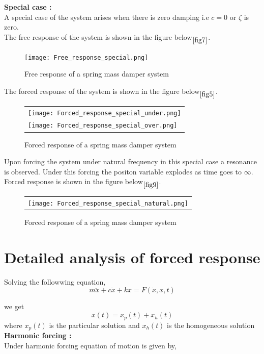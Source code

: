 \documentclass[11pt]{article}
\begin{document}
\newpage
\noindent\textbf{Special case :} \\
A special case of the system arises when there is zero damping i.e $c = 0$ or $\zeta$ is zero. \\
The free response of the system is shown in the figure below$\phantom{}_{\ref{fig7}}$.

\begin{figure}[H]
	\centering
	\centering
	\texttt{[image: Free\_response\_special.png]}
	\caption{Free response of a spring mass damper system}
\end{figure}
\label{fig7}

\newpage
The forced response of the system is shown in the figure below$\phantom{}_{\ref{fig5}}$.

\begin{figure}[H]
	\centering
	\begin{tabular} {l}
	\texttt{[image: Forced\_response\_special\_under.png]} \\
	\texttt{[image: Forced\_response\_special\_over.png]} 
	\end{tabular}
	\caption{Forced response of a spring mass damper system}
\end{figure}
\label{fig8}

\newpage
\noindent Upon forcing the system under natural frequency in this special case a resonance is observed. Under this
forcing the positon variable explodes as time goes to $\infty$.\\
Forced response is shown in the figure below$\phantom{}_{\ref{fig9}}$.


\begin{figure}[H]
	\centering
	\begin{tabular} {l}
	\texttt{[image: Forced\_response\_special\_natural.png]} 
	\end{tabular}
	\caption{Forced response of a spring mass damper system}
\end{figure}
\label{fig9} 




\section{Detailed analysis of forced response\cite{norman}}

Solving the followwing equation,
$$ m\ddot{x} + c\dot{x} + kx = F(\dot{x},x,t) $$

\noindent we get 
$$ x(t) = x_p(t) + x_h(t)$$
where $x_p(t)$ is the particular solution and $x_h(t)$ is the homogeneous solution\\
\hfill \break
\noindent\textbf{Harmonic forcing :} \\
\noindent Under harmonic forcing equation of motion is given by,
\end{document}

